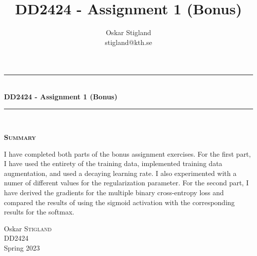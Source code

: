 \documentclass{article}
\title{DD2424 - Assignment 1 (Bonus)}
\author{Oskar Stigland \\ stigland@kth.se}
\begin{document}

	\begin{titlepage}
		\begin{center} 
			
			\rule{\linewidth}{0.5mm}\\[0.5 cm]
			{ \huge \bfseries DD2424 - Assignment 1 (Bonus)}\\[0.3 cm] %
			\rule{\linewidth}{0.5mm}\\[1 cm]
					
			\small\vfill
			\begin{center}
			\centering
			{\large \bfseries \textsc{Summary}}\\
			\vspace{1cm}
			\begin{minipage}{8cm}
				
				I have completed both parts of the bonus assignment exercises. For the first part, I have used the entirety of the training data, implemented training data augmentation, and used a decaying learning rate. I also experimented with a numer of different values for the regularization parameter. For the second part, I have derived the gradients for the multiple binary cross-entropy loss and compared the results of using the sigmoid activation with the corresponding results for the softmax.
			\end{minipage}
			\end{center}
			\large\vfill
						

		\end{center}	
		
		\begin{minipage}{0.4\textwidth}
			\begin{flushleft} \large
				Oskar \textsc{Stigland}\\
				DD2424\\
				Spring 2023
			\end{flushleft}
		\end{minipage}	

	\end{titlepage}

\newpage
\end{document}
